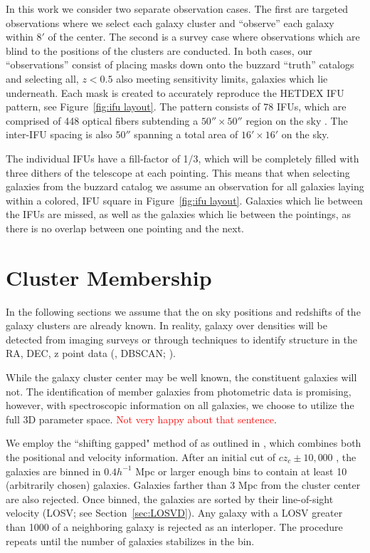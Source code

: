 \documentclass[apj, revtex4]{emulateapj}
\newcommand{\editorial}[1]{\textcolor{red}{#1}}
\begin{document}
In this work we consider two separate observation cases. The first are targeted observations where we select each galaxy cluster and ``observe'' each galaxy within $8'$ of the center. The second is a survey case where observations which are blind to the positions of the clusters are conducted. In both cases, our ``observations'' consist of placing masks down onto the buzzard ``truth'' catalogs and selecting all, $z< 0.5$ also meeting sensitivity limits, galaxies which lie underneath. Each mask is created to accurately reproduce the HETDEX IFU pattern, see Figure~\ref{fig:ifu layout}. The pattern consists of 78 IFUs, which are comprised of 448 optical fibers subtending a $50'' \times 50''$ region on the sky \citep{Kelz2014}. The inter-IFU spacing is also $50''$ spanning a total area of $16'\times 16'$ on the sky. 

The individual IFUs have a fill-factor of 1/3, which will be completely filled with three dithers of the telescope at each pointing. This means that when selecting galaxies from the buzzard catalog we assume an observation for all galaxies laying within a colored, IFU square in Figure~\ref{fig:ifu layout}. Galaxies which lie between the IFUs are missed, as well as the galaxies which lie between the pointings, as there is no overlap between one pointing and the next.

\section{Cluster Membership}
In the following sections we assume that the on sky positions and redshifts of the galaxy clusters are already known. In reality, galaxy over densities will be detected from imaging surveys  or through techniques to identify structure in the RA, DEC, z point data (\eg, DBSCAN; \citealt{Ester1996}).

While the galaxy cluster center may be well known, the constituent galaxies will not. The identification of member galaxies from photometric data  is promising, however, with spectroscopic information on all galaxies, we choose to utilize the full 3D parameter space. \editorial{Not very happy about that sentence}.

We employ the ``shifting gapped" method of \cite{Fadda1996} as outlined in \cite{Owers2011}, which combines both the positional and velocity information. After an initial cut of $cz_c \pm 10,000$ \kms, the galaxies are binned in $0.4h^{-1}$ Mpc or larger enough bins to contain at least 10 (arbitrarily chosen) galaxies. Galaxies farther than 3 Mpc from the cluster center are also rejected. Once binned, the galaxies are sorted by their line-of-sight velocity (LOSV; see Section~\ref{sec:LOSVD}). Any galaxy with a LOSV greater than 1000 \kms of a neighboring galaxy is rejected as an interloper. The procedure repeats until the number of galaxies stabilizes in the bin.
\end{document}
